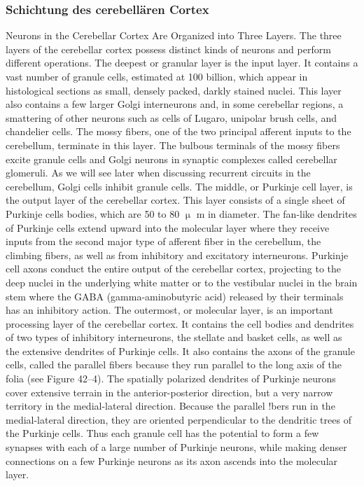 \documentclass[12pt,a4paper,pdftex]{article}
\begin{document}
\subsubsection{Schichtung des cerebellären Cortex}
Neurons in the Cerebellar Cortex Are Organized into Three Layers. The three layers of the cerebellar cortex possess distinct kinds of neurons and perform different operations.
The deepest or granular layer is the input layer. It contains a vast number of granule cells, estimated at 100 billion, which appear in histological sections as small, densely packed, darkly stained nuclei. This layer also contains a few larger Golgi interneurons and, in some cerebellar regions, a smattering of other neurons such as cells of Lugaro, unipolar brush cells, and chandelier cells. The mossy fibers, one of the two principal afferent inputs to the cerebellum, terminate in this layer. The bulbous terminals of the mossy fibers excite granule cells and Golgi neurons in synaptic complexes called cerebellar glomeruli. As we will see later when discussing recurrent circuits in the cerebellum, Golgi cells inhibit granule cells.
The middle, or Purkinje cell layer, is the output layer of the cerebellar cortex. This layer consists of a
single sheet of Purkinje cells bodies, which are 50 to 80 $\upmu$ m in diameter. The fan-like dendrites of Purkinje
cells extend upward into the molecular layer where they receive inputs from the second major type of
afferent fiber in the cerebellum, the climbing fibers, as well as from inhibitory and excitatory interneurons.
Purkinje cell axons conduct the entire output of the cerebellar cortex, projecting to the deep nuclei in the underlying white matter or to the vestibular nuclei in the brain stem where the GABA (gamma-aminobutyric acid) released by their terminals has an inhibitory action. The outermost, or molecular layer, is an important
processing layer of the cerebellar cortex. It contains the cell bodies and dendrites of two types of inhibitory
interneurons, the stellate and basket cells, as well as the extensive dendrites of Purkinje cells. It also contains the axons of the granule cells, called the parallel fibers because they run parallel to the long axis of
the folia (see Figure 42–4). The spatially polarized dendrites of Purkinje neurons cover extensive terrain
in the anterior-posterior direction, but a very narrow territory in the medial-lateral direction. Because the
parallel !bers run in the medial-lateral direction, they are oriented perpendicular to the dendritic trees of the
Purkinje cells. Thus each granule cell has the potential to form a few synapses with each of a large number
of Purkinje neurons, while making denser connections on a few Purkinje neurons as its axon ascends into the
molecular layer.
\end{document}
